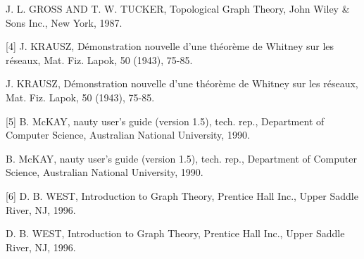 \documentclass[10pt]{article}
\begin{document}
\begin{tcolorbox}\relax
[3] J. L. GROSS AND T. W. TUCKER, Topological Graph Theory, John Wiley \& Sons Inc., New York, 1987.
\end{tcolorbox}

[4] J. KRAUSZ, Démonstration nouvelle d'une théorème de Whitney sur les réseaux, Mat. Fiz. Lapok, 50 (1943), 75-85.

\begin{tcolorbox}\relax
[4] J. KRAUSZ, Démonstration nouvelle d'une théorème de Whitney sur les réseaux, Mat. Fiz. Lapok, 50 (1943), 75-85.
\end{tcolorbox}

[5] B. McKAY, nauty user's guide (version 1.5), tech. rep., Department of Computer Science, Australian National University, 1990.

\begin{tcolorbox}\relax
[5] B. McKAY, nauty user's guide (version 1.5), tech. rep., Department of Computer Science, Australian National University, 1990.
\end{tcolorbox}

[6] D. B. WEST, Introduction to Graph Theory, Prentice Hall Inc., Upper Saddle River, NJ, 1996.

\begin{tcolorbox}\relax
[6] D. B. WEST, Introduction to Graph Theory, Prentice Hall Inc., Upper Saddle River, NJ, 1996.
\end{tcolorbox}
\end{document}

